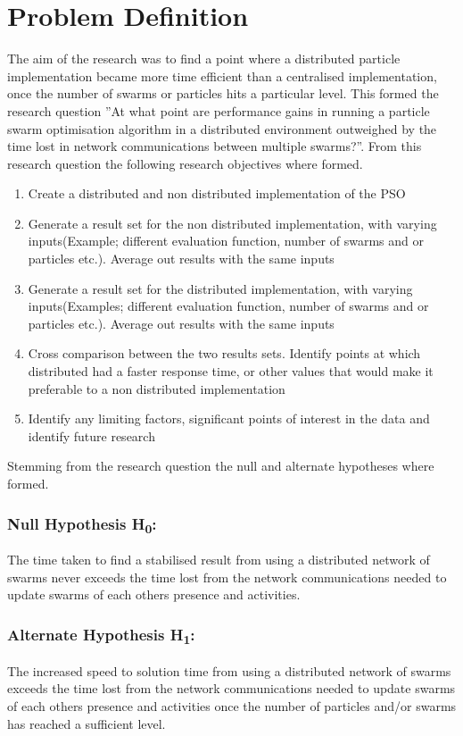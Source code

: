 \documentclass[oneside,12pt]{book}
\begin{document}
\section{Problem Definition}
The aim of the research was to find a point where a distributed particle implementation became more time efficient than a centralised implementation, once the number of swarms or particles hits a particular level. This formed the research question ”At what point are performance gains in running  a particle swarm optimisation algorithm in a distributed environment outweighed by the time lost in  network communications between multiple swarms?”. From this research question the following research objectives where formed. 
\begin{enumerate}
\item Create a distributed and non distributed implementation of the PSO
\item Generate a result set for the non distributed implementation, with varying inputs(Example; different evaluation function, number of swarms and or particles etc.). Average out results with the same inputs
\item Generate a result set for the distributed implementation, with varying inputs(Examples; different evaluation function, number of swarms and or particles etc.). Average out results with the same inputs
\item Cross comparison between the two results sets. Identify points at which distributed had a faster response time, or other values that would make it preferable to  a non distributed implementation
\item Identify any limiting factors, significant points of interest in the data and identify future research
\end{enumerate}
Stemming from the research question the null and alternate hypotheses where formed. 
\subsubsection{Null Hypothesis H\textsubscript{0}:}
The time taken to find a stabilised result from using a distributed network of swarms never exceeds the time lost from the network communications needed to update swarms of each others presence and activities.

\subsubsection{Alternate Hypothesis H\textsubscript{1}:}
The increased speed to solution time from using a distributed network of swarms exceeds the time lost from the network communications needed to update swarms of each others presence and activities once the number of particles and/or swarms has reached a sufficient level.
\end{document}
